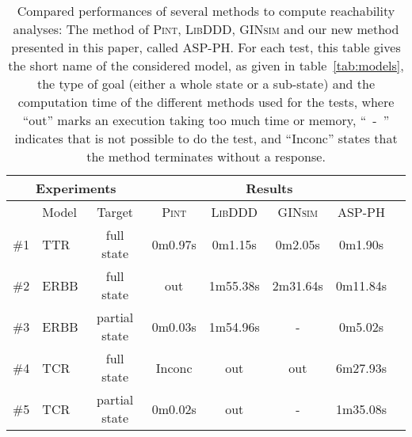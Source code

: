 \begin{table*}[ht]
\begin{center}
\noindent%
\begin{tabular}{|l|l|c||c|c|c|c|c|}
\hline
  \multicolumn{3}{|c||}{Experiments} & \multicolumn{4}{c|}{Results} \\
\hline
  & Model & Target  & \textsc{Pint} & \textsc{LibDDD} & \textsc{GINsim} & \textsc{ASP-PH} \\
\hline
\hline
  \#1 & TTR & full state & 0m0.97s & 0m1.15s &  0m2.05s & 0m1.90s \\
\hline
  \#2 & ERBB & full state & out &1m55.38s & 2m31.64s & 0m11.84s \\
\hline
  \#3 & ERBB & partial state  & 0m0.03s &1m54.96s & - & 0m5.02s \\
\hline
  \#4 & TCR & full state & Inconc & out & out & 6m27.93s \\
\hline
  \#5 & TCR & partial state & 0m0.02s & out & - & 1m35.08s \\
\hline
\end{tabular}
\vspace*{4pt}
\caption{\label{tab:reachability}
Compared performances of several methods to compute reachability analyses:
The method of \textsc{Pint}, \textsc{LibDDD}, \textsc{GINsim} and our new method presented in this paper, called \textsc{ASP-PH}.
For each test, this table gives the short name of the considered model,
as given in table~\ref{tab:models},
the type of goal (either a whole state or a sub-state)
and the computation time of the different methods used for the tests,
where “out” marks an execution taking too much time or memory,
\mbox{“~-~”} indicates that is not possible to do the test,
and “Inconc” states that the method terminates without a response.
}
\end{center}
\end{table*}



